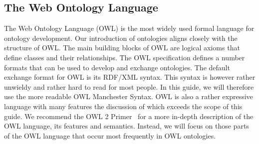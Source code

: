 \subsection{The Web Ontology Language}
\label{ssec:ontology-languages}

The Web Ontology Language (OWL) is the most widely used formal language for ontology development. Our introduction of ontologies aligns closely with the structure of OWL. The main building blocks of OWL are logical axioms that define classes and their relationships. The OWL specification defines a number formats that can be used to develop and exchange ontologies. The default exchange format for OWL is its RDF/XML syntax. This syntax is however rather unwieldy and rather hard to read for most people. In this guide, we will therefore use the more readable OWL Manchester Syntax. OWL is also a rather expressive language with many features the discussion of which exceeds the scope of this guide. We recommend the OWL 2 Primer~\cite{owlprimer} for a more in-depth description of the OWL language, its features and semantics. 
Instead, we will focus on those parts of the OWL language that occur most frequently in OWL ontologies. %
  
